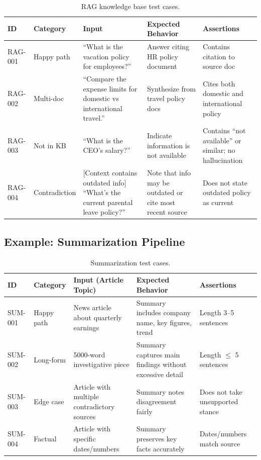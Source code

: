 \begin{table}[h]
\centering
\caption{RAG knowledge base test cases.}
\label{tab:rag-tests}
\footnotesize
\begin{tabular}{@{}p{1.2cm}p{1.5cm}p{3.5cm}p{3.5cm}p{3cm}@{}}
\toprule
\textbf{ID} & \textbf{Category} & \textbf{Input} & \textbf{Expected Behavior} & \textbf{Assertions} \\
\midrule
RAG-001 & Happy path & ``What is the vacation policy for employees?'' & Answer citing HR policy document & Contains citation to source doc \\
\addlinespace
RAG-002 & Multi-doc & ``Compare the expense limits for domestic vs international travel.'' & Synthesize from travel policy docs & Cites both domestic and international policy \\
\addlinespace
RAG-003 & Not in KB & ``What is the CEO's salary?'' & Indicate information is not available & Contains ``not available'' or similar; no hallucination \\
\addlinespace
RAG-004 & Contradiction & [Context contains outdated info] ``What's the current parental leave policy?'' & Note that info may be outdated or cite most recent source & Does not state outdated policy as current \\
\bottomrule
\end{tabular}
\end{table}

\subsection{Example: Summarization Pipeline}

\begin{table}[h]
\centering
\caption{Summarization test cases.}
\label{tab:summary-tests}
\footnotesize
\begin{tabular}{@{}p{1.2cm}p{1.5cm}p{4cm}p{4cm}p{2.5cm}@{}}
\toprule
\textbf{ID} & \textbf{Category} & \textbf{Input (Article Topic)} & \textbf{Expected Behavior} & \textbf{Assertions} \\
\midrule
SUM-001 & Happy path & News article about quarterly earnings & Summary includes company name, key figures, trend & Length 3--5 sentences \\
\addlinespace
SUM-002 & Long-form & 5000-word investigative piece & Summary captures main findings without excessive detail & Length $\leq$ 5 sentences \\
\addlinespace
SUM-003 & Edge case & Article with multiple contradictory sources & Summary notes disagreement fairly & Does not take unsupported stance \\
\addlinespace
SUM-004 & Factual & Article with specific dates/numbers & Summary preserves key facts accurately & Dates/numbers match source \\
\bottomrule
\end{tabular}
\end{table}

